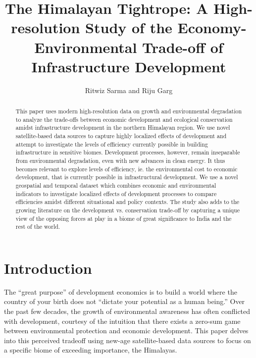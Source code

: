 \documentclass[doublespace,times,Afour,review]{template/sagej}
\begin{document}

\title{The Himalayan Tightrope: A High-resolution Study of the Economy-Environmental Trade-off of Infrastructure Development}

\author{Ritwiz Sarma and Riju Garg}




\begin{abstract}
This paper uses modern high-resolution data on growth and environmental degradation to analyze the trade-offs between economic development and ecological conservation amidst infrastructure development in the northern Himalayan region. We use novel satellite-based data sources to capture highly localized effects of development and attempt to investigate the levels of efficiency currently possible in building infrastructure in sensitive biomes. Development processes, however, remain inseparable from environmental degradation, even with new advances in clean energy. It thus becomes relevant to explore levels of efficiency, ie. the environmental cost to economic development, that is currently possible in infrastructural development. We use a novel geospatial and temporal dataset which combines economic and environmental indicators to investigate localized effects of development processes to compare efficiencies amidst different situational and policy contexts. The study also adds to the growing literature on the development vs. conservation trade-off by capturing a unique view of the opposing forces at play in a biome of great significance to India and the rest of the world.

\end{abstract}


\maketitle



\section{Introduction}
The “great purpose” of development economics is to build a world where the country of your birth does not “dictate your potential as a human being.”  Over the past few decades, the growth of environmental awareness has often conflicted with development, courtesy of the intuition that there exists a zero-sum game between environmental protection and economic development. This paper delves into this perceived tradeoff using new-age satellite-based data sources to focus on a specific biome of exceeding importance, the Himalayas.
\end{document}
